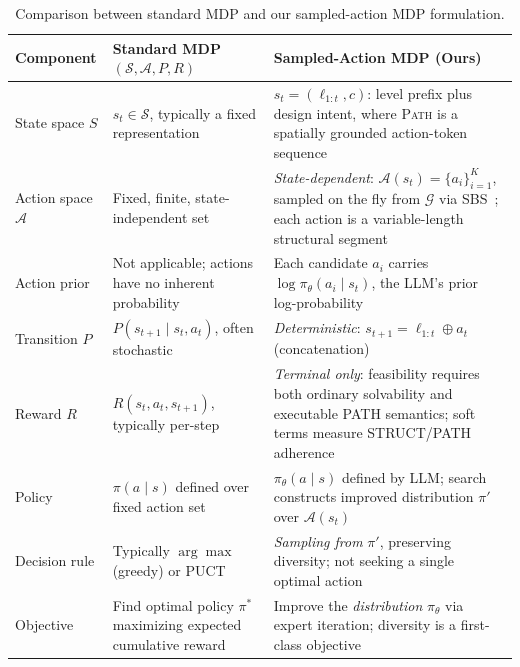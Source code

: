 \documentclass[11pt,a4paper]{article}
\begin{document}
\begin{table}[t]
\centering
\caption{Comparison between standard MDP and our sampled-action MDP formulation.}
\label{tab:mdp_comparison}
\begin{tabular}{p{2.2cm} p{4.5cm} p{6.8cm}}
\toprule
\textbf{Component} & \textbf{Standard MDP} \((\mathcal{S}, \mathcal{A}, P, R)\) & \textbf{Sampled-Action MDP (Ours)} \\
\midrule
State space \(S\) & \(s_t \in \mathcal{S}\), typically a fixed representation & \(s_t = (\ell_{1:t}, c)\): level prefix plus design intent, where \textsc{Path} is a spatially grounded action-token sequence \\
\addlinespace
Action space \(\mathcal{A}\) & Fixed, finite, state-independent set & \emph{State-dependent}: \(\mathcal{A}(s_t) = \{a_i\}_{i=1}^K\), sampled on the fly from \(\mathcal{G}\) via SBS~\cite{kool2019}; each action is a variable-length structural segment \\
\addlinespace
Action prior & Not applicable; actions have no inherent probability & Each candidate \(a_i\) carries \(\log \pi_\theta(a_i \mid s_t)\), the LLM's prior log-probability \\
\addlinespace
Transition \(P\) & \(P(s_{t+1} \mid s_t, a_t)\), often stochastic & \emph{Deterministic}: \(s_{t+1} = \ell_{1:t} \oplus a_t\) (concatenation) \\
\addlinespace
Reward \(R\) & \(R(s_t, a_t, s_{t+1})\), typically per-step & \emph{Terminal only}: feasibility requires both ordinary solvability and executable PATH semantics; soft terms measure STRUCT/PATH adherence \\
\addlinespace
Policy & \(\pi(a \mid s)\) defined over fixed action set & \(\pi_\theta(a \mid s)\) defined by LLM; search constructs improved distribution \(\pi'\) over \(\mathcal{A}(s_t)\) \\
\addlinespace
Decision rule & Typically \(\arg\max\) (greedy) or PUCT & \emph{Sampling from} \(\pi'\), preserving diversity; not seeking a single optimal action \\
\addlinespace
Objective & Find optimal policy \(\pi^*\) maximizing expected cumulative reward & Improve the \emph{distribution} \(\pi_\theta\) via expert iteration; diversity is a first-class objective \\
\bottomrule
\end{tabular}
\end{table}
\end{document}
